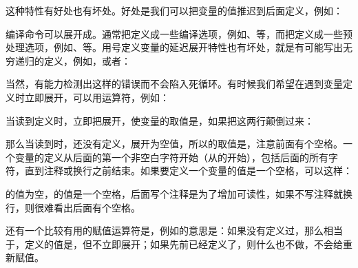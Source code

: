 这种特性有好处也有坏处。好处是我们可以把变量的值推迟到后面定义，例如：




编译命令可以展开成。通常把定义成一些编译选项，例如、等，而把定义成一些预处理选项，例如、等。用\BookCode{=\BookSplit{}}号定义变量的延迟展开特性也有坏处，就是有可能写出无穷递归的定义，例如，或者：




当然，有能力检测出这样的错误而不会陷入死循环。有时候我们希望在遇到变量定义时立即展开，可以用\BookCode{:\BookSplit{}=\BookSplit{}}运算符，例如：




当读到定义时，立即把展开，使变量的取值是，如果把这两行颠倒过来：




那么当读到时，还没有定义，展开为空值，所以的取值是，注意前面有个空格。一个变量的定义从\BookCode{=\BookSplit{}}后面的第一个非空白字符开始（从的\BookCode{\$}开始），包括后面的所有字符，直到注释或换行之前结束。如果要定义一个变量的值是一个空格，可以这样：




的值为空，的值是一个空格，后面写个注释是为了增加可读性，如果不写注释就换行，则很难看出后面有个空格。



还有一个比较有用的赋值运算符是，例如的意思是：如果没有定义过，那么相当于\BookCode{=\BookSplit{}}，定义的值是，但不立即展开；如果先前已经定义了，则什么也不做，不会给重新赋值。



